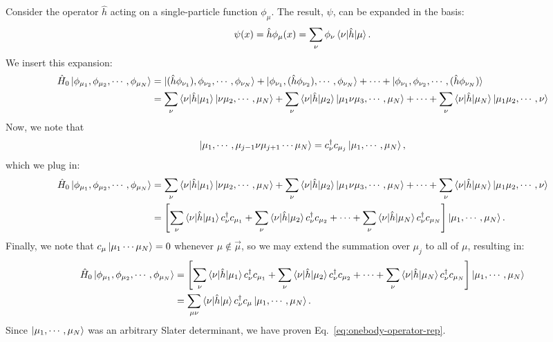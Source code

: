 \documentclass{report}
\theoremstyle{plain}
\theoremstyle{definition}
\begin{document}
Consider the operator $\hat{h}$ acting on a single-particle
function $\phi_\mu$. The result, $\psi$, can be expanded in the basis:
\begin{equation}
  \psi(x) = \hat{h}\phi_\mu(x) = \sum_\nu \phi_\nu
  \braket{\nu|\hat{h}|\mu}.
\end{equation}
We insert this expansion:
\begin{equation}
  \begin{split}
    \hat{H}_0 \ket{\phi_{\mu_1}, \phi_{\mu_2}, \cdots, \phi_{\mu_N}}
    & = \ket{(\hat{h}\phi_{\nu_1}), \phi_{\nu_2},\cdots,\phi_{\nu_N}}
    + \ket{\phi_{\nu_1}, (\hat{h}\phi_{\nu_2}),\cdots,\phi_{\nu_N}} +
    \cdots +
    \ket{\phi_{\nu_1},\phi_{\nu_2},\cdots,(\hat{h}\phi_{\nu_N})} \\
    & = \sum_{\nu} \braket{\nu|\hat{h}|\mu_1}
    \ket{\nu\mu_2,\cdots,\mu_N} + 
    \sum_{\nu} \braket{\nu|\hat{h}|\mu_2}
    \ket{\mu_1\nu\mu_3,\cdots,\mu_N} + \cdots +
    \sum_{\nu} \braket{\nu|\hat{h}|\mu_N}
    \ket{\mu_1\mu_2,\cdots,\nu}
  \end{split}
\end{equation}
Now, we note that
\begin{equation}
  \ket{\mu_1,\cdots,\mu_{j-1}\nu\mu_{j+1}\cdots \mu_N} = c^\dag_\nu
  c_{\mu_j} \ket{\mu_1,\cdots,\mu_N},
\end{equation}
which we plug in:
\begin{equation}
  \begin{split}
    \hat{H}_0 \ket{\phi_{\mu_1}, \phi_{\mu_2}, \cdots, \phi_{\mu_N}} 
    & = \sum_{\nu} \braket{\nu|\hat{h}|\mu_1}
    \ket{\nu\mu_2,\cdots,\mu_N} + 
    \sum_{\nu} \braket{\nu|\hat{h}|\mu_2}
    \ket{\mu_1\nu\mu_3,\cdots,\mu_N} + \cdots +
    \sum_{\nu} \braket{\nu|\hat{h}|\mu_N}
    \ket{\mu_1\mu_2,\cdots,\nu} \\ 
    & =\left[\sum_{\nu} \braket{\nu|\hat{h}|\mu_1} c^\dag_\nu c_{\mu_1}
    + 
    \sum_{\nu} \braket{\nu|\hat{h}|\mu_2} c^\dag_\nu c_{\mu_2}
     + \cdots +
    \sum_{\nu} \braket{\nu|\hat{h}|\mu_N} c^\dag_\nu c_{\mu_N}\right]
    \ket{\mu_1,\cdots,\mu_N}.
  \end{split}
\end{equation}
Finally, we note that $c_\mu \ket{\mu_1\cdots\mu_N} = 0$ whenever
$\mu\notin\vec{\mu}$, so we may extend the summation over $\mu_j$ to
all of $\mu$, resulting in:
\begin{equation}
  \begin{split}
    \hat{H}_0 \ket{\phi_{\mu_1}, \phi_{\mu_2}, \cdots, \phi_{\mu_N}} 
    & =\left[\sum_{\nu} \braket{\nu|\hat{h}|\mu_1} c^\dag_\nu c_{\mu_1}
    + 
    \sum_{\nu} \braket{\nu|\hat{h}|\mu_2} c^\dag_\nu c_{\mu_2}
     + \cdots +
    \sum_{\nu} \braket{\nu|\hat{h}|\mu_N} c^\dag_\nu c_{\mu_N}\right]
    \ket{\mu_1,\cdots,\mu_N} \\
 & = \sum_{\mu\nu} \braket{\nu|\hat{h}|\mu} c^\dag_\nu c_\mu \ket{\mu_1,\cdots,\mu_N}.
  \end{split}
\end{equation}
Since $\ket{\mu_1,\cdots,\mu_N}$ was an arbitrary Slater determinant,
we have proven Eq.~\eqref{eq:onebody-operator-rep}.
\end{document}
